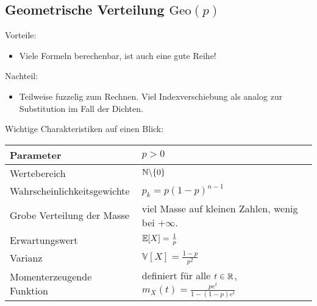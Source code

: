\documentclass[11pt, a4paper]{book}
\begin{document}
\subsection{Geometrische Verteilung $\text{Geo}(p)$}

{Vorteile:} 
\begin{itemize}
	\item Viele Formeln berechenbar, ist auch eine gute Reihe!
\end{itemize}

Nachteil:
\begin{itemize}
	\item Teilweise fuzzelig zum Rechnen. Viel Indexverschiebung als analog zur Substitution im Fall der Dichten.
\end{itemize}


Wichtige Charakteristiken auf einen Blick:
\begin{center}
\begin{tabular}[h]{|l|l|}
\hline
Parameter& $p>0$ \\
\hline
Wertebereich & $\mathbb{N}\backslash \{0\}$\\
\hline
Wahrscheinlichkeitsgewichte& $p_k=p(1-p)^{n-1}$\\
\hline
Grobe Verteilung der Masse & viel Masse auf kleinen Zahlen, wenig bei $+\infty$.\\
\hline
Erwartungswert& $\mathbb{E}[X]=\frac 1 p$ \\
\hline
Varianz & $\mathbb V[X]=\frac{1-p}{p^2}$\\
\hline
Momenterzeugende Funktion& definiert f\"ur alle $t\in \mathbb{R}$, $m_X(t)=\frac{pe^t}{1-(1-p)e^t}$\\
\hline
\end{tabular}
\end{center}
\end{document}
